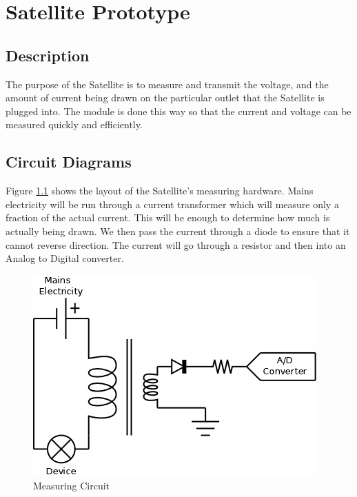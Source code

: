 
\chapter{Satellite Prototype}

\section{Description}

The purpose of the Satellite is to measure and transmit the voltage,
and the amount of current being drawn on the particular outlet that 
the Satellite is plugged into. The module is done this way so that
the current and voltage can be measured quickly and efficiently.

\section{Circuit Diagrams}


Figure \ref{MeasuringCircuit} shows the layout of the Satellite's 
measuring hardware. Mains electricity will be run through a current
transformer which will measure only a fraction of the actual current. 
This will be enough to determine how much is actually being drawn. 
We then pass the current through a diode to ensure that it cannot 
reverse direction. The current will go through a resistor and 
then into an Analog to Digital converter.

\begin{figure}[H]
\centering
\includegraphics[scale=0.3]{Hardware/images/MeasureCircuit.png}
\caption{Measuring Circuit}
\label{MeasuringCircuit}
\end{figure}

